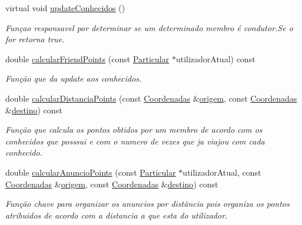 \begin{DoxyCompactItemize}
virtual void \hyperlink{class_anuncio_aedc37e812bc9aa7ca401716c1326cfb5}{update\+Conhecidos} ()
\begin{DoxyCompactList}\small\item\em Funçao responsavel por determinar se um determinado membro é condutor.\+Se o for retorna true. \end{DoxyCompactList}\item 
double \hyperlink{class_anuncio_a3a56180c8250d42d8c4d5ae4d834634b}{calcular\+Friend\+Points} (const \hyperlink{class_particular}{Particular} $\ast$utilizador\+Atual) const 
\begin{DoxyCompactList}\small\item\em Função que da update aos conhecidos. \end{DoxyCompactList}\item 
double \hyperlink{class_anuncio_aa432828d0e8b6d84fc284d24fa920911}{calcular\+Distancia\+Points} (const \hyperlink{class_coordenadas}{Coordenadas} \&\hyperlink{class_anuncio_a9b3f8ac29ebf2a44e24ea2273064a7f5}{origem}, const \hyperlink{class_coordenadas}{Coordenadas} \&\hyperlink{class_anuncio_acdac86595f84cfb8a2bf54c414857168}{destino}) const 
\begin{DoxyCompactList}\small\item\em Função que calcula os pontos obtidos por um membro de acordo com os conhecidos que posssui e com o numero de vezes que ja viajou com cada conhecido. \end{DoxyCompactList}\item 
double \hyperlink{class_anuncio_adbede34af2bb9824ec0811d4a85cc035}{calcular\+Anuncio\+Points} (const \hyperlink{class_particular}{Particular} $\ast$utilizador\+Atual, const \hyperlink{class_coordenadas}{Coordenadas} \&\hyperlink{class_anuncio_a9b3f8ac29ebf2a44e24ea2273064a7f5}{origem}, const \hyperlink{class_coordenadas}{Coordenadas} \&\hyperlink{class_anuncio_acdac86595f84cfb8a2bf54c414857168}{destino}) const 
\begin{DoxyCompactList}\small\item\em Função chave para organizar os anuncios por distância pois organiza os pontos atribuidos de acordo com a distancia a que esta do utilizador. \end{DoxyCompactList}\end{DoxyCompactItemize}

